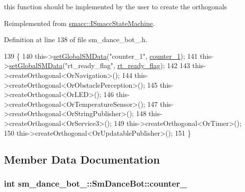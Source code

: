this function should be implemented by the user to create the orthogonals 



Reimplemented from \hyperlink{classsmacc_1_1ISmaccStateMachine_ac2982c6c8283663e5e1e8a7c82f511ec}{smacc\+::\+I\+Smacc\+State\+Machine}.



Definition at line 138 of file sm\+\_\+dance\+\_\+bot\+\_.\+h.


\begin{DoxyCode}
139     \{
140         this->\hyperlink{classsmacc_1_1ISmaccStateMachine_a8588f9e580fbb95b53e2bd2ca3ff1f98}{setGlobalSMData}(\textcolor{stringliteral}{"counter\_1"}, \hyperlink{structsm__dance__bot__3_1_1SmDanceBot_ad91a1bf0a46ee80bebe007a75cbe429d}{counter\_1});
141         this->\hyperlink{classsmacc_1_1ISmaccStateMachine_a8588f9e580fbb95b53e2bd2ca3ff1f98}{setGlobalSMData}(\textcolor{stringliteral}{"rt\_ready\_flag"}, \hyperlink{structsm__dance__bot__3_1_1SmDanceBot_a3f8e3b6a1b7cb4984e9fe281d84a2ab2}{rt\_ready\_flag});
142 
143         this->createOrthogonal<OrNavigation>();
144         this->createOrthogonal<OrObstaclePerception>();
145         this->createOrthogonal<OrLED>();
146         this->createOrthogonal<OrTemperatureSensor>();
147         this->createOrthogonal<OrStringPublisher>();
148         this->createOrthogonal<OrService3>();
149         this->createOrthogonal<OrTimer>();
150         this->createOrthogonal<OrUpdatablePublisher>();
151     \}
\end{DoxyCode}


\subsection{Member Data Documentation}
\subsubsection[{\texorpdfstring{counter\+\_\+1}{counter_1}}]{\setlength{\rightskip}{0pt plus 5cm}int sm\+\_\+dance\+\_\+bot\+\_\+::\+Sm\+Dance\+Bot\+::counter\+\_}\hypertarget{structsm__dance__bot__3_1_1SmDanceBot_ad91a1bf0a46ee80bebe007a75cbe429d}{}\label{structsm__dance__bot__3_1_1SmDanceBot_ad91a1bf0a46ee80bebe007a75cbe429d}


